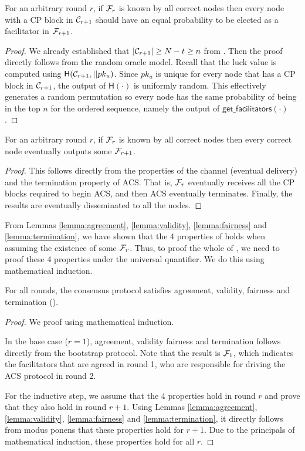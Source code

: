 \begin{lemma}
\label{lemma:fairness}
For an arbitrary round $r$,
if $\mathcal{F}_r$ is known by all correct nodes then
every node with a CP block in $\mathcal{C}_{r+1}$ should have an equal probability to be elected as a facilitator in $\mathcal{F}_{r+1}$.
\end{lemma}
\begin{proof}
We already established that $|\mathcal{C}_{r+1}| \ge N - t \ge n$ from .
Then the proof directly follows from the random oracle model.
Recall that the luck value is computed using $\textsf{H}(\mathcal{C}_{r+1}, || pk_u)$.
Since $pk_u$ is unique for every node that has a CP block in $\mathcal{C}_{r+1}$,
the output of $\textsf{H}(\cdot)$ is uniformly random.
This effectively generates a random permutation
so every node has the same probability of being in the top $n$ for the ordered sequence,
namely the output of $\textsf{get\_facilitators}(\cdot)$.
\end{proof}

\begin{lemma}
\label{lemma:termination}
For an arbitrary round $r$,
if $\mathcal{F}_r$ is known by all correct nodes then
every correct node eventually outputs some $\mathcal{F}_{r + 1}$.
\end{lemma}
\begin{proof}
This follows directly from the properties of the channel (eventual delivery)
and the termination property of ACS.
That is, $\mathcal{F}_r$ eventually receives all the CP blocks required to begin ACS,
and then ACS eventually terminates.
Finally, the results are eventually disseminated to all the nodes.
\end{proof}

From Lemmas \ref{lemma:agreement}, \ref{lemma:validity}, \ref{lemma:fairness} and \ref{lemma:termination},
we have shown that the 4 properties of  holds when assuming the existence of some $\mathcal{F}_r$.
Thus, to proof the whole of ,
we need to proof these 4 properties under the universal quantifier.
We do this using mathematical induction.

\begin{theorem}
\label{theorem:consensus}
For all rounds,
the consensus protocol satisfies agreement, validity, fairness and termination ().
\end{theorem}
\begin{proof}
We proof using mathematical induction.

In the base case ($r = 1$), agreement, validity fairness and termination follows directly from the bootstrap protocol.
Note that the result is $\mathcal{F}_1$, which indicates the facilitators that are agreed in round 1, who are responsible for driving the ACS protocol in round 2.

For the inductive step,
we assume that the 4 properties hold in round $r$ and prove that they also hold in round $r + 1$.
Using Lemmas \ref{lemma:agreement}, \ref{lemma:validity}, \ref{lemma:fairness} and \ref{lemma:termination},
it directly follows from modus ponens that these properties hold for $r + 1$.
Due to the principals of mathematical induction, these properties hold for all $r$.
\end{proof}

